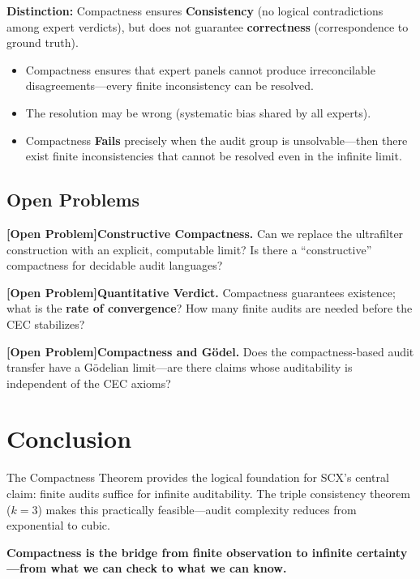 \documentclass[12pt,a4paper]{article}
\theoremstyle{remark}
\newcommand{\openproblem}{\textnormal{\textbf{[Open Problem]}}}
\begin{document}
\textbf{Distinction:} Compactness ensures \textbf{Consistency} (no logical contradictions among expert verdicts), but does not guarantee \textbf{correctness} (correspondence to ground truth).
\begin{itemize}[itemsep=2pt]
    \item Compactness ensures that expert panels cannot produce irreconcilable disagreements---every finite inconsistency can be resolved.
    \item The resolution may be wrong (systematic bias shared by all experts).
    \item Compactness \textbf{Fails} precisely when the audit group is unsolvable---then there exist finite inconsistencies that cannot be resolved even in the infinite limit.
\end{itemize}

\subsection{Open Problems}
\openproblem \textbf{Constructive Compactness.} Can we replace the ultrafilter construction with an explicit, computable limit? Is there a ``constructive'' compactness for decidable audit languages?

\openproblem \textbf{Quantitative Verdict.} Compactness guarantees existence; what is the \textbf{rate of convergence}? How many finite audits are needed before the CEC stabilizes?

\openproblem \textbf{Compactness and Gödel.} Does the compactness-based audit transfer have a Gödelian limit---are there claims whose auditability is independent of the CEC axioms?
\section{Conclusion}
The Compactness Theorem provides the logical foundation for SCX's central claim: finite audits suffice for infinite auditability. The triple consistency theorem (\(k=3\)) makes this practically feasible---audit complexity reduces from exponential to cubic.

\textbf{Compactness is the bridge from finite observation to infinite certainty---from what we can check to what we can know.}
\end{document}
